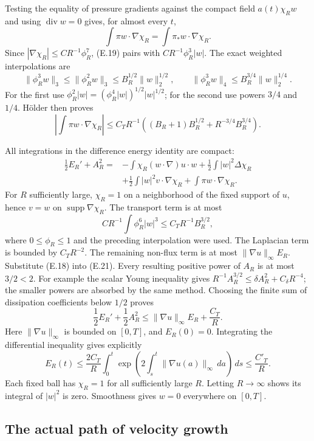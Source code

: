 \documentclass[10pt,a4paper]{article}
\begin{document}
Testing the equality of pressure gradients against the compact field
$a(t)\chi_Rw$ and using $\operatorname{div}w=0$ gives, for almost
every $t$,
\[
 \int\pi w\cdot\nabla\chi_R=\int\pi_*w\cdot\nabla\chi_R.
\]
Since $|\nabla\chi_R|\le CR^{-1}\phi_R^7$, (E.19) pairs with
$CR^{-1}\phi_R^3|w|$. The exact weighted interpolations are
\[
 \|\phi_R^3w\|_3\le\|\phi_R^2w\|_3
                 \le B_R^{1/2}\|w\|_2^{1/2},\qquad
 \|\phi_R^3w\|_4\le B_R^{3/4}\|w\|_2^{1/4}.
\]
For the first use $\phi_R^2|w|=(\phi_R^4|w|)^{1/2}|w|^{1/2}$;
for the second use powers $3/4$ and $1/4$. Hölder then proves
\[
 \left|\int\pi w\cdot\nabla\chi_R\right|
 \le C_TR^{-1}
       \left((B_R+1)B_R^{1/2}+R^{-3/4}B_R^{3/4}\right).
 \tag{E.21}
\]

All integrations in the difference energy identity are compact:
\[
 \begin{split}
 \frac12E_R'+A_R^2={}&-\int\chi_R(w\cdot\nabla)u\cdot w
       +\frac12\int|w|^2\Delta\chi_R\\
 &+\frac12\int|w|^2v\cdot\nabla\chi_R
       +\int\pi w\cdot\nabla\chi_R .
 \end{split}
 \tag{E.22}
\]
For $R$ sufficiently large, $\chi_R=1$ on a neighborhood of the
fixed support of $u$, hence $v=w$ on $\operatorname{supp}\nabla\chi_R$.
The transport term is at most
\[
 CR^{-1}\int\phi_R^6|w|^3
 \le C_TR^{-1}B_R^{3/2},
\]
where $0\le\phi_R\le1$ and the preceding interpolation were used.
The Laplacian term is bounded by $C_TR^{-2}$.
The remaining non-flux term is at most $\|\nabla u\|_\infty E_R$.
Substitute (E.18) into (E.21). Every resulting positive power of
$A_R$ is at most $3/2<2$. For example the scalar Young inequality
gives $R^{-1}A_R^{3/2}\le\delta A_R^2+C_\delta R^{-4}$;
the smaller powers are absorbed by the same method. Choosing the
finite sum of dissipation coefficients below $1/2$ proves
\[
 \frac12E_R'+\frac12A_R^2
       \le\|\nabla u\|_\infty E_R+\frac{C_T}{R}.
\]
Here $\|\nabla u\|_\infty$ is bounded on $[0,T]$, and $E_R(0)=0$.
Integrating the differential inequality gives explicitly
\[
 E_R(t)\le\frac{2C_T}{R}\int_0^t
     \exp\left(2\int_s^t\|\nabla u(a)\|_\infty\,da\right)\,ds
       \le\frac{C'_T}{R}.
\]
Each fixed ball has $\chi_R=1$ for all sufficiently large $R$.
Letting $R\to\infty$ shows its integral of $|w|^2$ is zero.
Smoothness gives $w=0$ everywhere on $[0,T]$.

\subsection{The actual path of velocity growth}
\end{document}
